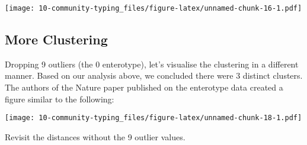 \documentclass[
  oneside]{book}
\newenvironment{Shaded}{\begin{snugshade}}{\end{snugshade}}
\newcommand{\AttributeTok}[1]{\textcolor[rgb]{0.77,0.63,0.00}{#1}}
\newcommand{\CommentTok}[1]{\textcolor[rgb]{0.56,0.35,0.01}{\textit{#1}}}
\newcommand{\DecValTok}[1]{\textcolor[rgb]{0.00,0.00,0.81}{#1}}
\newcommand{\FunctionTok}[1]{\textcolor[rgb]{0.00,0.00,0.00}{#1}}
\newcommand{\NormalTok}[1]{#1}
\newcommand{\OtherTok}[1]{\textcolor[rgb]{0.56,0.35,0.01}{#1}}
\newcommand{\SpecialCharTok}[1]{\textcolor[rgb]{0.00,0.00,0.00}{#1}}
\begin{document}
\texttt{[image: 10-community-typing\_files/figure-latex/unnamed-chunk-16-1.pdf]}

\hypertarget{more-clustering}{%
\subsection{More Clustering}\label{more-clustering}}

Dropping 9 outliers (the 0 enterotype), let's visualise the clustering in a different manner. Based on our analysis above, we concluded there were 3 distinct clusters. The authors of the Nature paper published on the enterotype data created a figure similar to the following:

\begin{Shaded}
\end{Shaded}

\begin{Shaded}
\end{Shaded}

\texttt{[image: 10-community-typing\_files/figure-latex/unnamed-chunk-18-1.pdf]}

Revisit the distances without the 9 outlier values.
\end{document}
